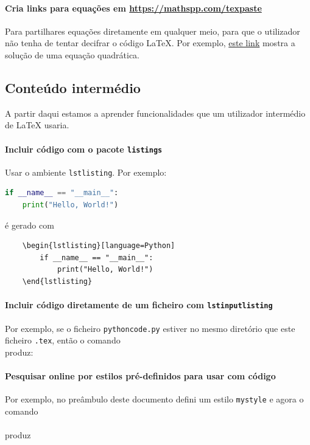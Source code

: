 \documentclass[11pt]{article}
\begin{document}
\paragraph{Cria links para equações em \url{https://mathspp.com/texpaste}}
Para partilhares equações diretamente em qualquer meio,
para que o utilizador não tenha de tentar decifrar o código LaTeX.
Por exemplo, \href{https://mathspp.com/texpaste\#0U1GpULBViEkrSkyu1k1SiCnIVYgpLiwqqU6KM1LQVTBJTK6trTZKrFVRAQA}
{este link} mostra a solução de uma equação quadrática.

\subsection{Conteúdo intermédio}
A partir daqui estamos a aprender funcionalidades que um utilizador intermédio
de LaTeX usaria.

\paragraph{Incluir código com o pacote \texttt{listings}}
Usar o ambiente \texttt{lstlisting}. Por exemplo:
\begin{lstlisting}[language=Python]
if __name__ == "__main__":
    print("Hello, World!")
\end{lstlisting}
é gerado com
\begin{verbatim}
    \begin{lstlisting}[language=Python]
        if __name__ == "__main__":
            print("Hello, World!")
    \end{lstlisting}
\end{verbatim}

\paragraph{Incluir código diretamente de um ficheiro com \texttt{lstinputlisting}}
Por exemplo, se o ficheiro \texttt{pythoncode.py} estiver no mesmo diretório que
este ficheiro \texttt{.tex}, então o comando \\
\verb|| produz:



\paragraph{Pesquisar online por estilos pré-definidos para usar com código}
Por exemplo, no preâmbulo deste documento defini um estilo \texttt{mystyle} e agora
o comando \\
\verb|| \\
produz
\end{document}

